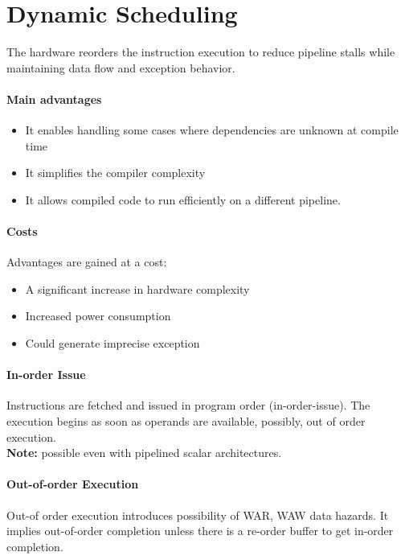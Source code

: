 
\section{Dynamic Scheduling}\label{sec:dynamic-scheduling}
The hardware reorders the instruction execution to reduce pipeline stalls while maintaining data flow and exception behavior.

\paragraph{Main advantages}
\begin{itemize}
    \item[] It enables handling some cases where dependencies are unknown at compile time
    \item[] It simplifies the compiler complexity
    \item[] It allows compiled code to run efficiently on a different pipeline.
\end{itemize}

\paragraph{Costs} Advantages are gained at a cost:
\begin{itemize}
    \item[] A significant increase in hardware complexity
    \item[] Increased power consumption
    \item[] Could generate imprecise exception
\end{itemize}

\paragraph{In-order Issue}
Instructions are fetched and issued in program order (in-order-issue).
The execution begins as soon as operands are available, possibly, out of order execution.\\
\textbf{Note:} possible even with pipelined scalar architectures.

\paragraph{Out-of-order Execution}
Out-of order execution introduces possibility of WAR, WAW data hazards.
It implies out-of-order completion unless there is a re-order buffer to get in-order completion.

